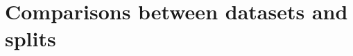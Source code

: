 \clearpage
\onecolumn
\section{Comparisons between datasets and splits}
\label{app:dataset_split_comparisons}


%
%
%

%
%
%

%
%
%

\twocolumn
